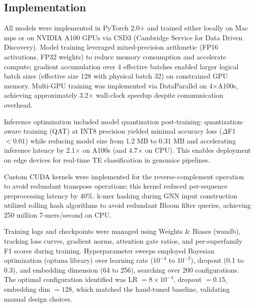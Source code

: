 \documentclass[12pt]{article}
\begin{document}
\subsection{Implementation}

All models were implemented in PyTorch 2.0+ and trained either locally on Mac mps or on NVIDIA A100 GPUs via CSD3 (Cambridge Service for Data Driven Discovery). Model training leveraged mixed-precision arithmetic (FP16 activations, FP32 weights) to reduce memory consumption and accelerate compute; gradient accumulation over 4 effective batches enabled larger logical batch sizes (effective size 128 with physical batch 32) on constrained GPU memory. Multi-GPU training was implemented via DataParallel on 4$\times$A100s, achieving approximately 3.2$\times$ wall-clock speedup despite communication overhead.

Inference optimization included model quantization post-training: quantization-aware training (QAT) at INT8 precision yielded minimal accuracy loss ($\Delta$F1 $< 0.01$) while reducing model size from 1.2 MB to 0.31 MB and accelerating inference latency by 2.1$\times$ on A100s (and 4.7$\times$ on CPU). This enables deployment on edge devices for real-time TE classification in genomics pipelines.

Custom CUDA kernels were implemented for the reverse-complement operation to avoid redundant transpose operations; this kernel reduced per-sequence preprocessing latency by 40\%. k-mer hashing during GNN input construction utilized rolling hash algorithms to avoid redundant Bloom filter queries, achieving 250 million 7-mers/second on CPU.

Training logs and checkpoints were managed using Weights \& Biases (wandb), tracking loss curves, gradient norms, attention gate ratios, and per-superfamily F1 scores during training. Hyperparameter sweeps employed Bayesian optimization (optuna library) over learning rate ($10^{-4}$ to $10^{-2}$), dropout (0.1 to 0.3), and embedding dimension (64 to 256), searching over 200 configurations. The optimal configuration identified was LR $= 8 \times 10^{-4}$, dropout $= 0.15$, embedding dim $= 128$, which matched the hand-tuned baseline, validating manual design choices.
\end{document}
